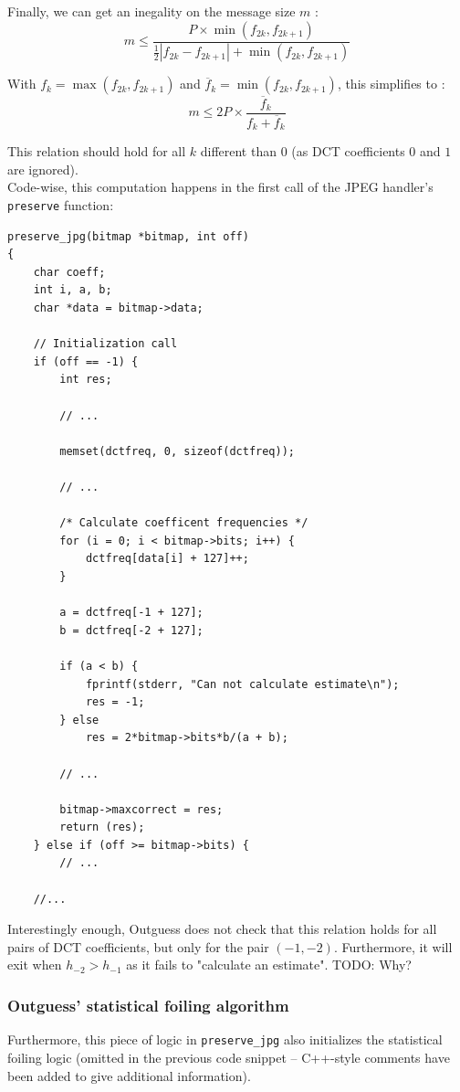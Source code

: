 \documentclass{article}
\begin{document}
Finally, we can get an inegality on the message size $m$ : \[
	m \le \frac { P \times \min(f_{2k}, f_{2k + 1}) } { \frac 1 2 \left|f_{2k} - f_{2k + 1}\right| + \min(f_{2k}, f_{2k + 1}) }
\]

With $f_k = \max(f_{2k}, f_{2k + 1})$ and $\overline f_k = \min(f_{2k}, f_{2k + 1})$, this simplifies to : \[
	m \le 2 P \times \frac {\overline f_k} { f_k + \overline f_k }
\]

This relation should hold for all $k$ different than $0$ (as DCT coefficients $0$ and $1$ are ignored). \\

Code-wise, this computation happens in the first call of the JPEG handler's \texttt{preserve} function:
\begin{verbatim}
preserve_jpg(bitmap *bitmap, int off)
{
	char coeff;
	int i, a, b;
	char *data = bitmap->data;
	
	// Initialization call
	if (off == -1) {
		int res;
		
		// ...

		memset(dctfreq, 0, sizeof(dctfreq));
		
		// ...

		/* Calculate coefficent frequencies */
		for (i = 0; i < bitmap->bits; i++) {
			dctfreq[data[i] + 127]++;
		}
		
		a = dctfreq[-1 + 127];
		b = dctfreq[-2 + 127];
		
		if (a < b) {
			fprintf(stderr, "Can not calculate estimate\n");
			res = -1;
		} else
			res = 2*bitmap->bits*b/(a + b);
		
		// ...
		
		bitmap->maxcorrect = res;
		return (res);
	} else if (off >= bitmap->bits) {
		// ...

	//...
\end{verbatim}

Interestingly enough, Outguess does not check that this relation holds for all pairs of DCT coefficients, but only for the pair $(-1, -2)$. Furthermore, it will exit when $h_{-2} > h_{-1}$ as it fails to "calculate an estimate". {\color{red} TODO: Why?}

\subsubsection{Outguess' statistical foiling algorithm}

Furthermore, this piece of logic in \texttt{preserve\_jpg} also initializes the statistical foiling logic (omitted in the previous code snippet -- C++-style comments have been added to give additional information).
\end{document}
